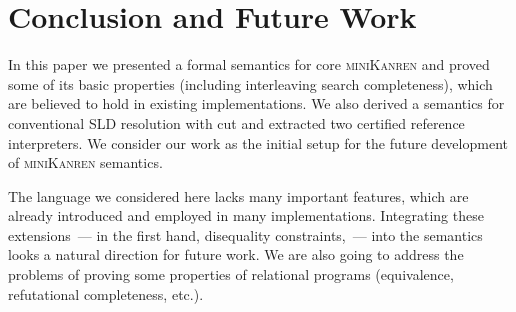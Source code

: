 \section{Conclusion and Future Work}

In this paper we presented a formal semantics for core \textsc{miniKanren} and proved some of its basic properties
(including interleaving search completeness), which are believed to hold in existing implementations.
We also derived a semantics for conventional SLD resolution with cut and extracted two certified reference interpreters.
We consider our work as the initial setup for the future development of \textsc{miniKanren} semantics.

The language we considered here lacks many important features, which are already introduced
and employed in many implementations. Integrating these extensions~--- in the first hand, disequality constraints,~--- into
the semantics looks a natural direction for future work. We are also going to address the problems of proving some
properties of relational programs (equivalence, refutational completeness, etc.).
